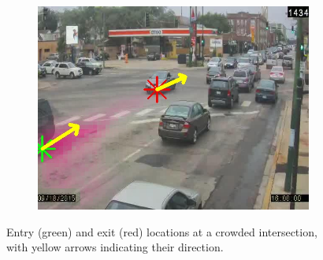 \begin{figure}
\begin{subfigure}{0.32\linewidth}
            \includegraphics[width=\linewidth]{./img/scene_learning/res/diverseyWestern/diverseyWestern-5.jpg}
        \end{subfigure}
        \caption{Entry (green) and exit (red) locations at a crowded intersection, with yellow arrows indicating their direction.}
        \label{fig:entry-exit-full-3}
\end{figure}